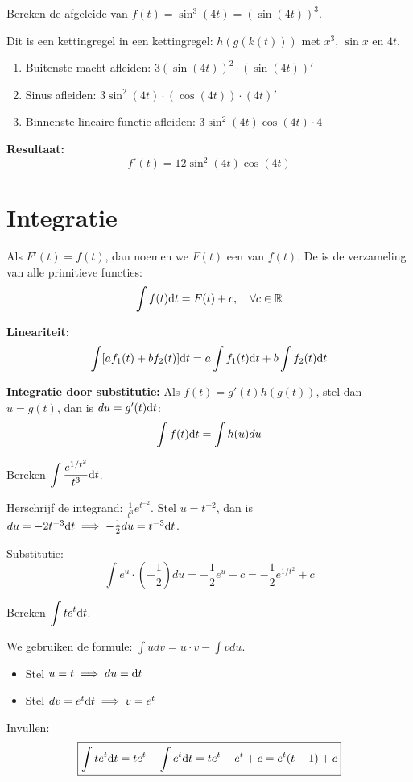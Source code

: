 \begin{voorbeeld}
Bereken de afgeleide van $f(t) = \sin^3(4t) = (\sin(4t))^3$.

Dit is een kettingregel in een kettingregel: $h(g(k(t)))$ met $x^3$, $\sin x$ en $4t$.
\begin{enumerate}
    \item Buitenste macht afleiden: $3(\sin(4t))^2 \cdot (\sin(4t))'$
    \item Sinus afleiden: $3\sin^2(4t) \cdot (\cos(4t)) \cdot (4t)'$
    \item Binnenste lineaire functie afleiden: $3\sin^2(4t) \cos(4t) \cdot 4$
\end{enumerate}
\textbf{Resultaat:}
\[ \boxed{f'(t) = 12 \sin^2(4t) \cos(4t)} \]
\end{voorbeeld}

\section{Integratie}

\begin{conceptbox}
Als $F'(t) = f(t)$, dan noemen we $F(t)$ een  van $f(t)$.
De  is de verzameling van alle primitieve functies:
\[ \int f(t) \mathrm{d} t = F(t) + c, \quad \forall c \in \mathbb{R} \]
\end{conceptbox}

\begin{theorie}
\textbf{Lineariteit:}
\[ \int [a f_1(t) + b f_2(t)] \mathrm{d} t = a \int f_1(t) \mathrm{d} t + b \int f_2(t) \mathrm{d} t \]

\textbf{Integratie door substitutie:}
Als $f(t) = g'(t) h(g(t))$, stel dan $u = g(t)$, dan is $du = g'(t) \mathrm{d} t$:
\[ \int f(t) \mathrm{d} t = \int h(u) du \]
\end{theorie}

\begin{voorbeeld}
Bereken $\displaystyle \int \frac{e^{1/t^2}}{t^3} \mathrm{d} t$.

Herschrijf de integrand: $\displaystyle \frac{1}{t^3} e^{t^{-2}}$.
Stel $u = t^{-2}$, dan is $du = -2t^{-3} \mathrm{d} t \implies -\frac{1}{2} du = t^{-3} \mathrm{d} t$.

Substitutie:
\[ \boxed{\int e^u \cdot \left(-\frac{1}{2}\right) du = -\frac{1}{2} e^u + c = -\frac{1}{2} e^{1/t^2} + c} \]
\end{voorbeeld}

\begin{voorbeeld}
Bereken $\displaystyle \int t e^t \mathrm{d} t$.

We gebruiken de formule: $\displaystyle \int u dv = u\cdot v - \int v du$.
\begin{itemize}
    \item Stel $u = t \implies du = \mathrm{d} t$
    \item Stel $dv = e^t \mathrm{d} t \implies v = e^t$
\end{itemize}
Invullen:
\[ \boxed{\int t e^t \mathrm{d} t = t e^t - \int e^t \mathrm{d} t = t e^t - e^t + c = e^t(t-1) + c} \]
\end{voorbeeld}

